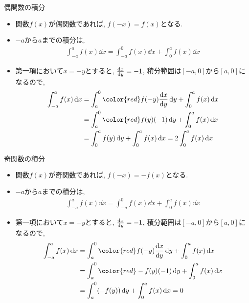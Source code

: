 \documentclass[dvipdfmx,notheorems,t]{beamer}
\begin{document}
\begin{frame}{偶関数の積分}
\begin{itemize}
  \item 関数$f(x)$が偶関数であれば, $f(-x) = f(x)$となる.
  \item $-a$から$a$までの積分は,
  \begin{align*}
    \int_{-a}^a f(x) \dd{x} = \int_{-a}^0 f(x) \dd{x} + \int_0^a f(x) \dd{x}
  \end{align*}
  \item 第一項において$x = -y$とすると, $\dv{x}{y} = -1$, 積分範囲は$[-a, 0]$から$[a, 0]$になるので,
  \begin{align*}
    \int_{-a}^a f(x) \dd{x} &= \int_a^0 {\color{red} f(-y)} \dv{x}{y} \dd{y} + \int_0^a f(x) \dd{x} \\
      &= \int_a^0 {\color{red} f(y)} (-1) \dd{y} + \int_0^a f(x) \dd{x} \\
      &= \int_0^a f(y) \dd{y} + \int_0^a f(x) \dd{x}
      = 2 \int_0^a f(x) \dd{x}
  \end{align*}
\end{itemize}
\end{frame}

\begin{frame}{奇関数の積分}
\begin{itemize}
  \item 関数$f(x)$が奇関数であれば, $f(-x) = -f(x)$となる.
  \item $-a$から$a$までの積分は,
  \begin{align*}
    \int_{-a}^a f(x) \dd{x} = \int_{-a}^0 f(x) \dd{x} + \int_0^a f(x) \dd{x}
  \end{align*}
  \item 第一項において$x = -y$とすると, $\dv{x}{y} = -1$, 積分範囲は$[-a, 0]$から$[a, 0]$になるので,
  \begin{align*}
    \int_{-a}^a f(x) \dd{x} &= \int_a^0 {\color{red} f(-y)} \dv{x}{y} \dd{y} + \int_0^a f(x) \dd{x} \\
      &= \int_a^0 {\color{red} -f(y)} (-1) \dd{y} + \int_0^a f(x) \dd{x} \\
      &= \int_a^0 (-f(y)) \dd{y} + \int_0^a f(x) \dd{x} = 0
  \end{align*}
\end{itemize}
\end{frame}
\end{document}

